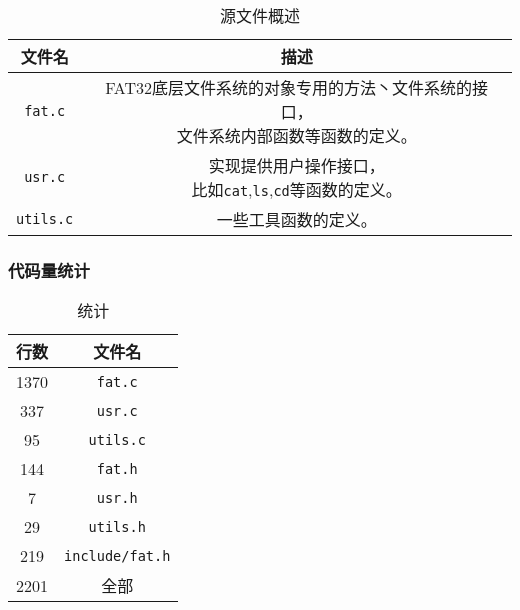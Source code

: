 \begin{table}[H]
  \centering
  \caption{源文件概述}
  \begin{tabular}{|c|c|}
  \hline
  文件名 & 描述 \\
  \hline
  \texttt{fat.c} & \makecell{FAT32底层文件系统的对象专用的方法丶文件系统的接口，\\文件系统内部函数等函数的定义。} \\
  \hline
  \texttt{usr.c}  & \makecell{实现提供用户操作接口，\\比如\texttt{cat},\texttt{ls},\texttt{cd}等函数的定义。} \\
  \hline
  \texttt{utils.c} & 一些工具函数的定义。 \\
  \hline
  \end{tabular}
\end{table}


\subsubsection{代码量统计}

\begin{table}[H]
  \centering
  \caption{统计}
  \begin{tabular}{|c|c|}
  \hline
  行数 & 文件名 \\
  \hline
  1370 & \texttt{fat.c}   \\
  \hline
  337  & \texttt{usr.c}   \\
  \hline
  95   & \texttt{utils.c} \\
  \hline
  144  & \texttt{fat.h}   \\
  \hline
  7    & \texttt{usr.h}   \\
  \hline
  29   & \texttt{utils.h} \\
  \hline
  219  & \texttt{include/fat.h} \\
  \hline
  2201 & 全部    \\
  \hline
  \end{tabular}
\end{table}

